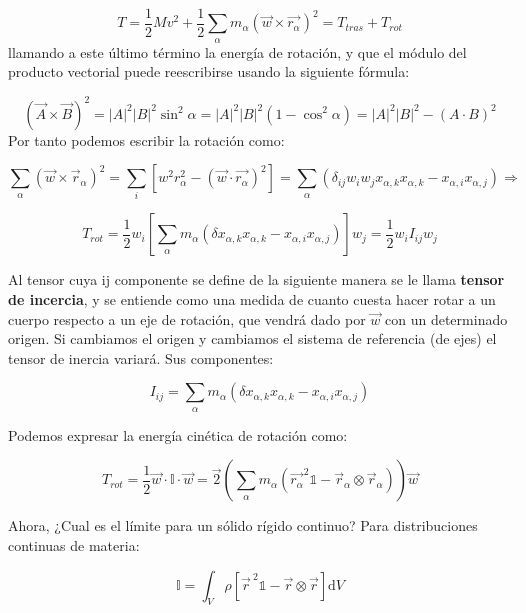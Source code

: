 \documentclass[12pt,a4paper]{book}
\newcommand{\parentesis}[1]{\left( #1  \right)}
\newcommand{\D}{\mathrm{d}}
\begin{document}
\begin{equation}
T = \dfrac{1}{2} M v^2 + \dfrac{1}{2} \sum_\alpha m_\alpha (\vec{w} \times \vec{r_\alpha})^2  = T_{tras} + T_{rot}
\end{equation}
llamando a este último término la energía de rotación, y que el módulo del producto vectorial puede reescribirse usando la siguiente fórmula:

\begin{equation}
(\vec{A} \times \vec{B})^2 = |A|^2|B|^2 \sin^2 \alpha  = |A|^2|B|^2 (1- \cos^2 \alpha) =  |A|^2|B|^2 - (A \cdot B)^2
\end{equation}
Por tanto podemos escribir la rotación como:

$$ \sum_\alpha (\vec{w} \times \vec{r}_\alpha)^2 = \sum_i \left[ w^2 r_\alpha^2 - (\vec{w} \cdot \vec{r_\alpha})^2 \right] = \sum_{\alpha} (\delta_{ij}   w_{i} w_{j} x_{\alpha,k} x_{\alpha,k} - x_{\alpha,i} x_{\alpha,j})  \Longrightarrow $$

\begin{equation} T_{rot} = \dfrac{1}{2} w_i \left[  \sum_{\alpha} m_\alpha (\delta x_{\alpha,k} x_{\alpha,k} -  x_{\alpha,i}  x_{\alpha,j} )    \right] w_j = \dfrac{1}{2} w_i I_{ij} w_j 
\end{equation}

Al tensor cuya ij componente se define de la siguiente manera se le llama \textbf{tensor de incercia}, y se entiende como una medida de cuanto cuesta hacer rotar a un cuerpo respecto a un eje de rotación, que vendrá dado por $\vec{w}$ con un determinado origen. Si cambiamos el origen y cambiamos el sistema de referencia (de ejes) el tensor de inercia variará. Sus componentes:

\begin{equation}
I_{ij}  =\sum_{\alpha}    m_\alpha (\delta x_{\alpha,k} x_{\alpha,k} -  x_{\alpha,i}  x_{\alpha,j} )   
\end{equation}


Podemos expresar la energía cinética de rotación como:

\begin{equation}
T_{rot} = \dfrac{1}{2} \vec{w} \cdot \mathbb{I} \cdot \vec{w} = \vec{2} \parentesis{ \sum_\alpha m_\alpha (\vec{r_\alpha}^2 \mathds{1} - \vec{r}_\alpha \otimes \vec{r}_\alpha )} \vec{w}
\end{equation}

Ahora, ¿Cual es el límite para un sólido rígido continuo? Para distribuciones continuas de materia:

\begin{equation}
\mathbb{I} = \int_V  \rho [\vec{r}^{ \ 2} \mathds{1} - \vec{r} \otimes \vec{r}] \D V
\end{equation}
\end{document}
